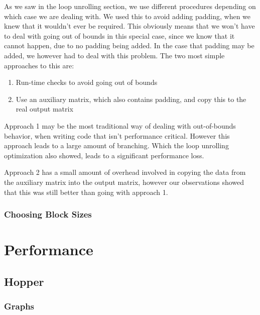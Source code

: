 \documentclass[a4paper,11pt,oneside]{book}
\begin{document}
As we saw in the loop unrolling section, we use different procedures depending
on which case we are dealing with. We used this to avoid adding padding, when we
knew that it wouldn't ever be required. This obviously means that we won't have
to deal with going out of bounds in this special case, since we know that it
cannot happen, due to no padding being added. In the case that padding may be
added, we however had to deal with this problem. The two most simple approaches 
to this are:

\begin{enumerate}
  \item Run-time checks to avoid going out of bounds
  \item Use an auxiliary matrix, which also contains padding, and copy this to 
        the real output matrix
\end{enumerate}

Approach 1 may be the most traditional way of dealing with out-of-bounds
behavior, when writing code that isn't performance critical. However this
approach leads to a large amount of branching. Which the loop unrolling
optimization also showed, leads to a significant performance loss.

Approach 2 has a small amount of overhead involved in copying the data from the
auxiliary matrix into the output matrix, however our observations showed that
this was still better than going with approach 1.


\subsection{Choosing Block Sizes}


\chapter{Performance}


\section{Hopper}
\subsection{Graphs}
\end{document}
